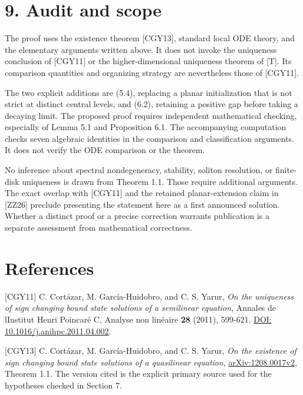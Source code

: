 \documentclass[11pt]{article}
\begin{document}
\section{9. Audit and scope}\label{audit-and-scope}

The proof uses the existence theorem {[}CGY13{]}, standard local ODE
theory, and the elementary arguments written above. It does not invoke
the uniqueness conclusion of {[}CGY11{]} or the higher-dimensional
uniqueness theorem of {[}T{]}. Its comparison quantities and organizing
strategy are nevertheless those of {[}CGY11{]}.

The two explicit additions are (5.4), replacing a planar initialization
that is not strict at distinct central levels, and (6.2), retaining a
positive gap before taking a decaying limit. The proposed proof requires
independent mathematical checking, especially of Lemma 5.1 and
Proposition 6.1. The accompanying computation checks seven algebraic
identities in the comparison and classification arguments. It does not
verify the ODE comparison or the theorem.

No inference about spectral nondegeneracy, stability, soliton
resolution, or finite-disk uniqueness is drawn from Theorem 1.1. Those
require additional arguments. The exact overlap with {[}CGY11{]} and the
retained planar-extension claim in {[}ZZ26{]} preclude presenting the
statement here as a first announced solution. Whether a distinct proof
or a precise correction warrants publication is a separate assessment
from mathematical correctness.

\section{References}\label{references}

{[}CGY11{]} C. Cortázar, M. García-Huidobro, and C. S. Yarur, \emph{On
the uniqueness of sign changing bound state solutions of a semilinear
equation}, Annales de l\textquotesingle Institut Henri Poincaré C,
Analyse non linéaire \textbf{28} (2011), 599-621.
\href{https://doi.org/10.1016/j.anihpc.2011.04.002}{DOI:
10.1016/j.anihpc.2011.04.002}.

{[}CGY13{]} C. Cortázar, M. García-Huidobro, and C. S. Yarur, \emph{On
the existence of sign changing bound state solutions of a quasilinear
equation}, \href{https://arxiv.org/abs/1208.0017v2}{arXiv:1208.0017v2},
Theorem 1.1. The version cited is the explicit primary source used for
the hypotheses checked in Section 7.
\end{document}
